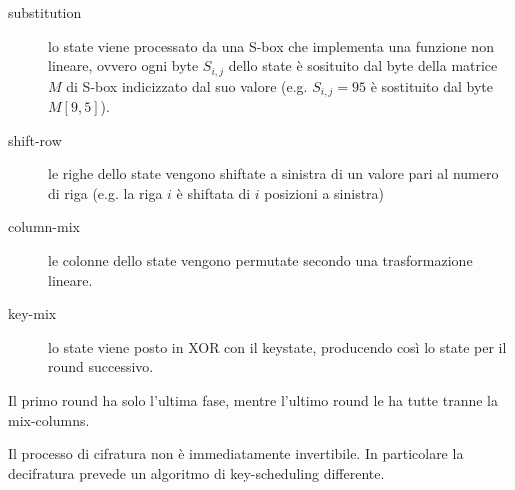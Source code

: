 \begin{description}
  \item[substitution] lo state viene processato da una S-box che implementa una funzione non lineare, ovvero ogni byte $S_{i,j}$ dello state è sosituito dal byte della matrice $M$ di S-box indicizzato dal suo valore (e.g. $S_{i,j}=95$ è sostituito dal byte $M[9,5]$).
  \item[shift-row] le righe dello state vengono shiftate a sinistra di un valore pari al numero di riga (e.g. la riga $i$ è shiftata di $i$ posizioni a sinistra)
  \item[column-mix] le colonne dello state vengono permutate secondo una trasformazione lineare.
  \item[key-mix] lo state viene posto in XOR con il keystate, producendo così lo state per il round successivo.
\end{description}

Il primo round ha solo l'ultima fase, mentre l'ultimo round le ha tutte tranne la mix-columns.

Il processo di cifratura non è immediatamente invertibile. In particolare la decifratura prevede un algoritmo di key-scheduling differente.
